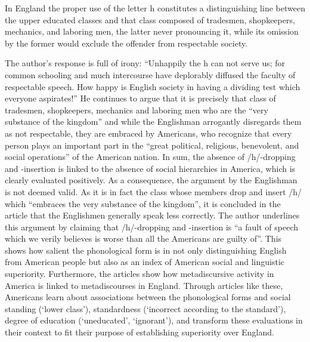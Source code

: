 \begin{ipquote}
In England the proper use of the letter h constitutes a distinguishing line between the upper educated classes and that class composed of tradesmen, shopkeepers, mechanics, and laboring men, the latter never pronouncing it, while its omission by the former would exclude the offender from respectable society.
\end{ipquote}


The author’s response is full of irony: “Unhappily the h can not serve us; for common schooling and much intercourse have deplorably diffused the faculty of respectable speech. How happy is English society in having a dividing test which everyone aspirates!” He continues to argue that it is precisely that class of tradesmen, shopkeepers, mechanics and laboring men who are the “very substance of the kingdom” and while the Englishman arrogantly disregards them as not respectable, they are embraced by Americans, who recognize that every person plays an important part in the “great political, religious, benevolent, and social operations” of the American nation. In sum, the absence of /h/-dropping and -insertion is linked to the absence of social hierarchies in America, which is clearly evaluated positively. As a consequence, the argument by the Englishman is not deemed valid. As it is in fact the class whose members drop and insert /h/ which “embraces the very substance of the kingdom”, it is concluded in the article that the Englishmen generally speak less correctly. The author underlines this argument by claiming that /h/-dropping and -insertion is “a fault of speech which we verily believes is worse than all the Americans are guilty of”. This shows how salient the phonological form is in not only distinguishing English from American people but also as an index of American social and linguistic superiority. Furthermore, the articles show how metadiscursive activity in America is linked to metadiscourses in England. Through articles like these, Americans learn about associations between the phonological forms and social standing (‘lower class’), standardness (‘incorrect according to the standard’), degree of education (‘uneducated’, ‘ignorant’), and transform these evaluations in their context to fit their purpose of establishing superiority over England.


